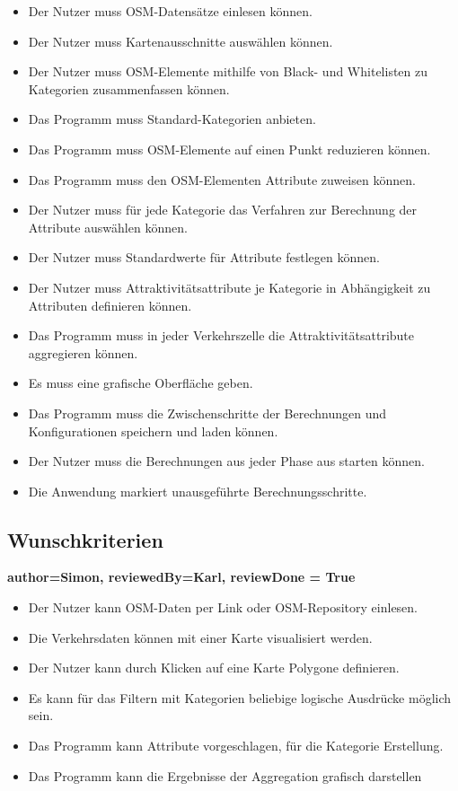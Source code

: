 \documentclass[parskip=full]{scrartcl} %
\begin{document}
\begin{itemize}
    \item Der Nutzer muss OSM-Datensätze einlesen können.
    \item Der Nutzer muss Kartenausschnitte auswählen können.
    \item Der Nutzer muss OSM-Elemente mithilfe von Black- und Whitelisten zu Kategorien zusammenfassen können.
    \item Das Programm muss Standard-Kategorien anbieten.
    \item Das Programm muss OSM-Elemente auf einen Punkt reduzieren können.
    \item Das Programm muss den OSM-Elementen Attribute zuweisen können.
    \item Der Nutzer muss für jede Kategorie das Verfahren zur Berechnung der Attribute auswählen können.
    \item Der Nutzer muss Standardwerte für Attribute festlegen können.
    \item Der Nutzer muss Attraktivitätsattribute je Kategorie in Abhängigkeit zu Attributen definieren können.
    \item Das Programm muss in jeder Verkehrszelle die Attraktivitätsattribute aggregieren können.
    \item Es muss eine grafische Oberfläche geben.
    \item Das Programm muss die Zwischenschritte der Berechnungen und Konfigurationen speichern und laden können.
    \item Der Nutzer muss die Berechnungen aus jeder Phase aus starten können.
    \item Die Anwendung markiert unausgeführte Berechnungsschritte.
\end{itemize}


\subsection{Wunschkriterien}
\textbf{author=Simon, reviewedBy=Karl, reviewDone = True\\}
\begin{itemize}
    \item Der Nutzer kann OSM-Daten per Link oder OSM-Repository einlesen.
    \item Die Verkehrsdaten können mit einer Karte visualisiert werden.
    \item Der Nutzer kann durch Klicken auf eine Karte Polygone definieren.
    \item Es kann für das Filtern mit Kategorien beliebige logische Ausdrücke möglich sein.
    \item Das Programm kann Attribute vorgeschlagen, für die Kategorie Erstellung.
    \item Das Programm kann die Ergebnisse der Aggregation grafisch darstellen
    
\end{itemize}
\end{document}
